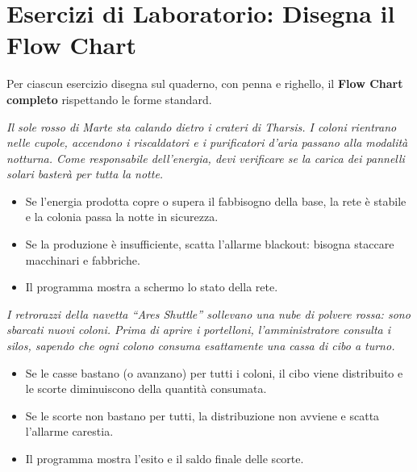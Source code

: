 \newpage
\section{Esercizi di Laboratorio: Disegna il Flow Chart}

Per ciascun esercizio disegna sul quaderno, con penna e righello, il \textbf{Flow Chart completo} rispettando le forme standard.

\begin{esercizio}
\emph{Il sole rosso di Marte sta calando dietro i crateri di Tharsis. I coloni rientrano nelle cupole, accendono i riscaldatori e i purificatori d'aria passano alla modalità notturna. Come responsabile dell'energia, devi verificare se la carica dei pannelli solari basterà per tutta la notte.}

\begin{itemize}
  \item Se l'energia prodotta copre o supera il fabbisogno della base, la rete è stabile e la colonia passa la notte in sicurezza.
  \item Se la produzione è insufficiente, scatta l'allarme blackout: bisogna staccare macchinari e fabbriche.
  \item Il programma mostra a schermo lo stato della rete.
\end{itemize}
\end{esercizio}

\begin{esercizio}
\emph{I retrorazzi della navetta ``Ares Shuttle'' sollevano una nube di polvere rossa: sono sbarcati nuovi coloni. Prima di aprire i portelloni, l'amministratore consulta i silos, sapendo che ogni colono consuma esattamente una cassa di cibo a turno.}

\begin{itemize}
  \item Se le casse bastano (o avanzano) per tutti i coloni, il cibo viene distribuito e le scorte diminuiscono della quantità consumata.
  \item Se le scorte non bastano per tutti, la distribuzione non avviene e scatta l'allarme carestia.
  \item Il programma mostra l'esito e il saldo finale delle scorte.
\end{itemize}
\end{esercizio}

